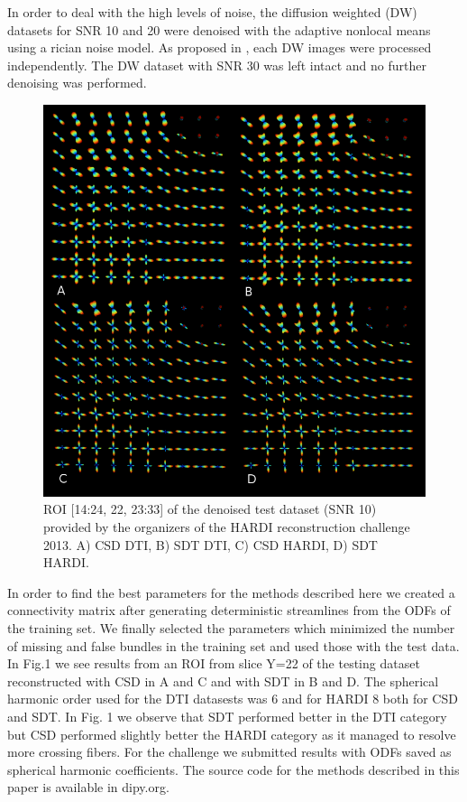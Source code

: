 \documentclass[9pt,conference,a4paper]{IEEEtran}
\begin{document}
In order to deal with the high levels of noise, the diffusion weighted (DW) datasets for SNR 10 and 20 were denoised with the adaptive nonlocal means \cite{manjon-coupe:10} using a rician noise model. As proposed in \cite{descoteaux-wiest-daessle-etal:08}, each DW images were processed independently. The DW dataset with SNR 30 was left intact and no further denoising was performed. 

\begin{figure}[h]
\begin{centering}
\includegraphics[scale=1.2]{csd_sdt_snr10}
\end{centering}
\caption{ROI [14:24, 22, 23:33] of the denoised test dataset (SNR 10) provided by the organizers of the HARDI reconstruction challenge 2013. A) CSD DTI, B) SDT DTI, 
C) CSD HARDI, D) SDT HARDI.}
\end{figure}

 In order to find the best parameters for the methods described here we created a connectivity matrix after generating deterministic streamlines from the ODFs of the training set. We finally selected the parameters which minimized the number of missing and false bundles in the training set and used those with the test data.
 In Fig.1 we see results from an ROI from slice Y=22 of the testing dataset reconstructed with CSD in A and C and with SDT in B and D. The spherical harmonic order used for the DTI datasests was 6 and for HARDI 8 both for CSD and SDT. In Fig. 1 we observe that SDT performed better in the DTI category but CSD performed slightly better the HARDI category as it managed to resolve more crossing fibers. For the challenge we submitted results with ODFs saved as spherical harmonic coefficients. The source code for the methods described in this paper is available in dipy.org.



\end{document}

